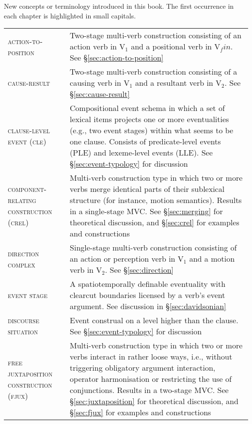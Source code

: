 
New concepts or terminology introduced in this book. The first occurrence in each chapter is highlighted in small capitals.

\vspace{1cm}
\begin{footnotesize}
\begin{longtable}{p{4cm} p{8cm}}
\renewcommand{\arraystretch}{1.5}
\textsc{action-to-position}  & Two-stage multi-verb construction consisting of an action verb in V$_1$ and a positional verb in V$_fin$. See §\ref{sec:action-to-position} \\

\textsc{cause-result}  & Two-stage multi-verb construction consisting of a causing verb in V$_1$ and a resultant verb in V$_2$. See §\ref{sec:cause-result} \\

\textsc{clause-level event (cle)}  & Compositional event schema in which a set of lexical items projects one or more eventualities (e.g., two event stages) within what seems to be one clause. Consists of predicate-level events (PLE) and lexeme-level events (LLE). See §\ref{sec:event-typology} for discussion \\
 
\textsc{component-relating construction (crel)}  & Multi-verb construction type in which two or more verbs merge identical parts of their sublexical structure (for instance, motion semantics). Results in a single-stage MVC. See §\ref{sec:merging} for theoretical discussion, and §\ref{sec:crel} for examples and constructions \\

\textsc{direction complex}  & Single-stage multi-verb construction consisting of an action or perception verb in V$_1$ and a motion verb in V$_2$. See §\ref{sec:direction} \\
 
\textsc{event stage}  & A spatiotemporally definable eventuality with clearcut boundaries licensed by a verb's event argument. See discussion in §\ref{sec:davidsonian} \\
 
\textsc{discourse situation}  & Event construal on a level higher than the clause. See §\ref{sec:event-typology} for discussion \\
 
\textsc{free juxtaposition construction (fjux)}  & Multi-verb construction type in which two or more verbs interact in rather loose ways, i.e., without triggering obligatory argument interaction, operator harmonisation or restricting the use of conjunctions. Results in a two-stage MVC. See §\ref{sec:juxtaposition} for theoretical discussion, and §\ref{sec:fjux} for examples and constructions \\


\end{longtable}
\end{footnotesize}
